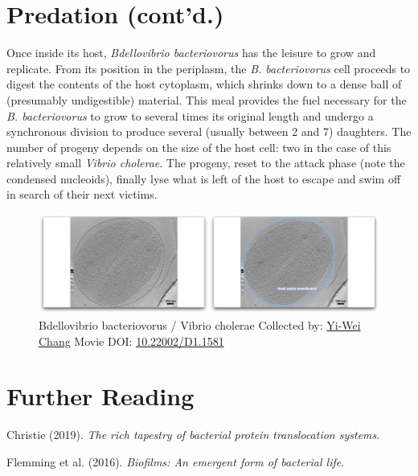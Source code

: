 \documentclass[]{tufte-book}
\begin{document}
\section{Predation (cont'd.)}\label{predation-contd.-1}

Once inside its host, \emph{Bdellovibrio bacteriovorus} has the leisure
to grow and replicate. From its position in the periplasm, the \emph{B.
bacteriovorus} cell proceeds to digest the contents of the host
cytoplasm, which shrinks down to a dense ball of (presumably
undigestible) material. This meal provides the fuel necessary for the
\emph{B. bacteriovorus} to grow to several times its original length and
undergo a synchronous division to produce several (usually between 2 and
7) daughters. The number of progeny depends on the size of the host
cell: two in the case of this relatively small \emph{Vibrio cholerae}.
The progeny, reset to the attack phase (note the condensed nucleoids),
finally lyse what is left of the host to escape and swim off in search
of their next victims.





\begin{figure}
\includegraphics{movie_stills/9_11} \caption[Bdellovibrio bacteriovorus / Vibrio cholerae Collected by:
\protect\hyperlink{yi-wei_chang}{Yi-Wei Chang} Movie DOI:
\href{https://doi.org/10.22002/D1.1581}{10.22002/D1.1581}]{Bdellovibrio bacteriovorus / Vibrio cholerae Collected by:
\protect\hyperlink{yi-wei_chang}{Yi-Wei Chang} Movie DOI:
\href{https://doi.org/10.22002/D1.1581}{10.22002/D1.1581}}\label{fig:9-11}
\end{figure}

\section{Further Reading}\label{further-reading-8}

Christie (2019). \emph{The rich tapestry of bacterial protein
translocation systems}.\citep{christie2019}

Flemming et al. (2016). \emph{Biofilms: An emergent form of bacterial
life}.\citep{flemming2016}
\end{document}
